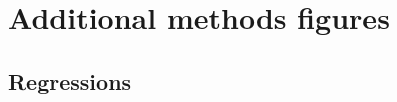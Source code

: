 
\clearpage
\section{Additional methods figures}
\label{app:methods-figures}

\subsection{Regressions}
\label{app:methods-figures-regressions}


